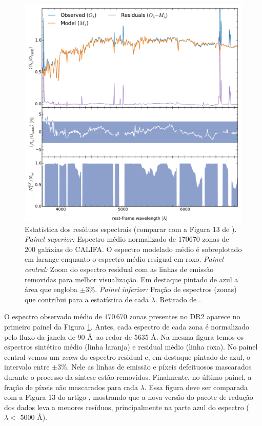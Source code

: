 \begin{figure}
	\centering
	\includegraphics[scale=0.6]{figuras/DR2_spectral_residuals.pdf}
	\caption[DR2: Espectros médios: observado, sintético e residual]
	{Estatística dos resíduos espectrais (comparar com a Figura 13 de \citealt{CidFernandes.etal.2014a}). {\em Painel superior:} Espectro médio normalizado de 170670 zonas de 200 galáxias do CALIFA. O espectro modelado médio é sobreplotado em larange enquanto o espectro médio resigual em roxo. {\em Painel central:} Zoom do espectro residual com as linhas de emissão removidas para melhor visualização. Em destaque pintado de azul a área que engloba $\pm 3\%$. {\em Painel inferior:} Fração de espectros (zonas) que contribui para a estatística de cada $\lambda$. Retirado de \citet{GarciaBenito.etal.2015a}.}
  \label{fig:obs_syn_res}
\end{figure}

O espectro observado médio de $170\,670$ zonas presentes no DR2 aparece no primeiro painel da Figura \ref{fig:obs_syn_res}. Antes, cada espectro de cada zona é normalizado pelo fluxo da janela de 90 \AA\ ao redor de 5635 \AA. Na mesma figura temos os espectros sintético médio (linha laranja) e residual médio (linha roxa). No painel central vemos um {\em zoom} do espectro residual e, em destaque pintado de azul, o intervalo entre $\pm 3$\%. Nele as linhas de emissão e píxeis defeituosos mascarados durante o processo da síntese estão removidos. Finalmente, no último painel, a fração de píxeis não mascarados para cada $\lambda$. Essa figura deve ser comparada com a Figura 13 do artigo \citet{CidFernandes.etal.2014a}, mostrando que a nova versão do pacote de redução dos dados leva a menores resíduos, principalmente na parte azul do espectro ($\lambda <$ 5000 \AA).

